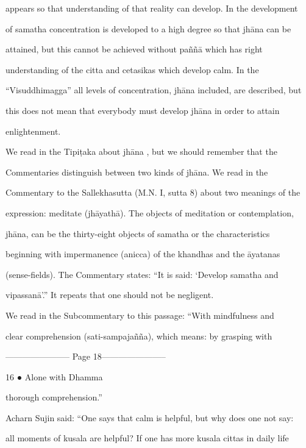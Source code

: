appears so that understanding of that reality can develop. In the development  

of  samatha concentration is developed to  a high degree  so that jhāna  can be  

attained,   but   this   cannot   be   achieved   without   paññā   which   has   right  

understanding   of   the   citta   and   cetasikas   which   develop   calm.   In   the  

“Visuddhimagga” all levels of concentration, jhāna included, are described, but  

this   does  not   mean   that   everybody   must   develop jhāna   in   order  to   attain  

enlightenment. 



We   read   in   the   Tipiṭaka   about  jhāna ,   but   we   should   remember   that   the  

Commentaries   distinguish   between   two   kinds   of   jhāna.   We   read   in   the  

Commentary to the Sallekhasutta  (M.N. I, sutta 8) about two meanings of the  

expression: meditate  (jhāyathā). The objects  of meditation  or contemplation,  

jhāna,   can   be   the   thirty-eight   objects   of   samatha   or   the   characteristics  

beginning   with   impermanence   (anicca)  of  the   khandhas   and  the   āyatanas  

 (sense-fields).   The   Commentary   states:   “It   is   said:   ‘Develop   samatha   and  

vipassanā’.” It repeats that one should not be negligent. 

   We  read  in  the   Subcommentary  to   this   passage:   “With  mindfulness   and  

clear   comprehension   (sati-sampajañña),   which   means:   by   grasping   with  


----------------------- Page 18-----------------------

16 ● Alone with Dhamma 



thorough comprehension.” 

     

Acharn  Sujin said: “One  says that calm is helpful, but why does one not  say:  

all moments  of kusala  are helpful? If one has more kusala  cittas in daily life  

